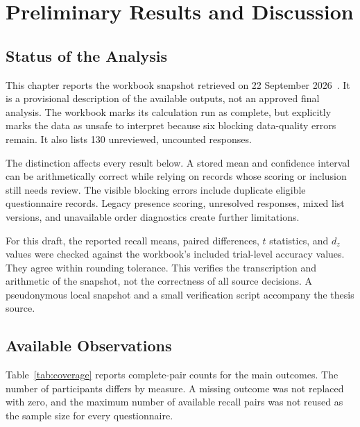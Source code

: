 \chapter{Preliminary Results and Discussion}
\label{chap:results}

\section{Status of the Analysis}
This chapter reports the workbook snapshot retrieved on 22 September 2026~\cite{srooranalysis}. It is a provisional description of the available outputs, not an approved final analysis. The workbook marks its calculation run as complete, but explicitly marks the data as unsafe to interpret because six blocking data-quality errors remain. It also lists 130 unreviewed, uncounted responses.

The distinction affects every result below. A stored mean and confidence interval can be arithmetically correct while relying on records whose scoring or inclusion still needs review. The visible blocking errors include duplicate eligible questionnaire records. Legacy presence scoring, unresolved responses, mixed list versions, and unavailable order diagnostics create further limitations.

For this draft, the reported recall means, paired differences, $t$ statistics, and $d_z$ values were checked against the workbook's included trial-level accuracy values. They agree within rounding tolerance. This verifies the transcription and arithmetic of the snapshot, not the correctness of all source decisions. A pseudonymous local snapshot and a small verification script accompany the thesis source.

\section{Available Observations}
Table~\ref{tab:coverage} reports complete-pair counts for the main outcomes. The number of participants differs by measure. A missing outcome was not replaced with zero, and the maximum number of available recall pairs was not reused as the sample size for every questionnaire.

